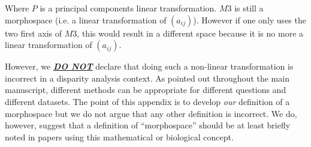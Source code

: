 \documentclass[12pt,letterpaper]{article}
\begin{document}
\noindent Where $P$ is a principal components linear transformation.
$M3$ is still a morphospace (i.e. a linear transformation of $(a_{ij})$). However if one only uses the two first axis of $M3$, this would result in a different space because it is no more a linear transformation of $(a_{ij})$.

However, we \textbf{\underline{\textit{DO NOT}}} declare that doing such a non-linear transformation is incorrect in a disparity analysis context.
As pointed out throughout the main manuscript, different methods can be appropriate for different questions and different datasets.
The point of this appendix is to develop \textit{our} definition of a morphospace but we do not argue that any other definition is incorrect.
We do, however, suggest that a definition of ``morphospace'' should be at least briefly noted in papers using this mathematical or biological concept.




\end{document}
